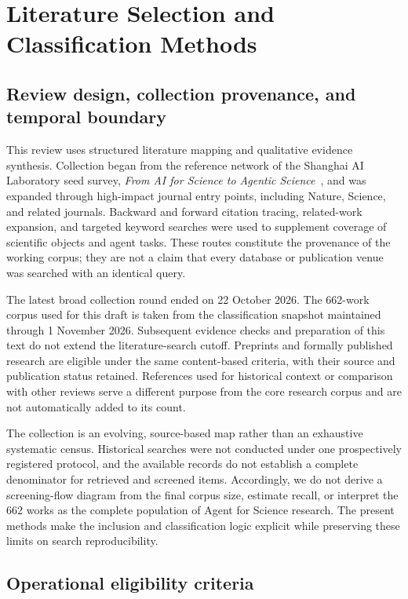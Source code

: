 \section{Literature Selection and Classification Methods}
\label{sec:methods}

\subsection{Review design, collection provenance, and temporal boundary}

This review uses structured literature mapping and qualitative evidence synthesis. Collection began from the reference network of the Shanghai AI Laboratory seed survey, \emph{From AI for Science to Agentic Science}~\cite{wei2025}, and was expanded through high-impact journal entry points, including Nature, Science, and related journals. Backward and forward citation tracing, related-work expansion, and targeted keyword searches were used to supplement coverage of scientific objects and agent tasks. These routes constitute the provenance of the working corpus; they are not a claim that every database or publication venue was searched with an identical query.

The latest broad collection round ended on 22 October 2026. The 662-work corpus used for this draft is taken from the classification snapshot maintained through 1 November 2026. Subsequent evidence checks and preparation of this text do not extend the literature-search cutoff. Preprints and formally published research are eligible under the same content-based criteria, with their source and publication status retained. References used for historical context or comparison with other reviews serve a different purpose from the core research corpus and are not automatically added to its count.

The collection is an evolving, source-based map rather than an exhaustive systematic census. Historical searches were not conducted under one prospectively registered protocol, and the available records do not establish a complete denominator for retrieved and screened items. Accordingly, we do not derive a screening-flow diagram from the final corpus size, estimate recall, or interpret the 662 works as the complete population of Agent for Science research. The present methods make the inclusion and classification logic explicit while preserving these limits on search reproducibility.

\subsection{Operational eligibility criteria}

